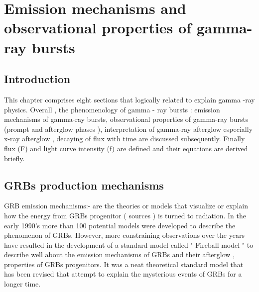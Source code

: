 \chapter{ Emission mechanisms and observational properties of gamma-ray bursts}
\label{chap:2}
\section{Introduction}
This chapter  comprises eight sections that  logically  related  to  explain  gamma -ray physics. Overall ,  the  phenomenology  of gamma - ray  bursts : emission mechanisms of gamma-ray bursts,  observational properties of  gamma-ray bursts (prompt and afterglow phases ), interpretation  of gamma-ray afterglow  especially x-ray afterglow , decaying of flux with time are  discussed  subsequently. Finally flux (F) and light curve intensity (f) are  defined  and their  equations  are  derived briefly.    
\section{GRBs production mechanisms}
GRB emission mechanisms:- are the theories or models that visualize or  explain  how the  energy from GRBs  progenitor ( sources ) is turned to radiation. In the early 1990’s   more than 100  potential  models  were  developed to describe the phenomenon of GRBs. However, more  constraining  observations  over  the  years have resulted in the  development of a standard  model called  " Fireball model " to describe  well about the  emission  mechanisms of GRBs and their afterglow , properties of GRBs progenitors. It was a neat theoretical standard model that has been revised that   attempt to explain  the mysterious events of GRBs for a longer time.\citep{13}
